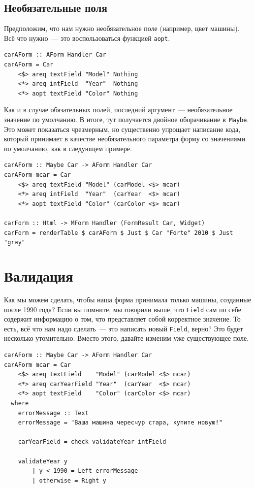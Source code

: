 \subsection{Необязательные поля}
Предположим, что нам нужно необязательное поле (например, цвет машины). Всё
что нужно~--- это воспользоваться функцией \lstinline'aopt'.

\begin{lstlisting}
carAForm :: AForm Handler Car
carAForm = Car
    <$> areq textField "Model" Nothing
    <*> areq intField  "Year"  Nothing
    <*> aopt textField "Color" Nothing
\end{lstlisting}%

Как и в случае обязательных полей, последний аргумент~--- необязательное
значение по умолчанию.  В итоге, тут получается двойное оборачивание
в~\lstinline'Maybe'. Это может показаться чрезмерным, но существенно упрощает
написание кода, который принимает в качестве необязательного параметра форму со
значениями по умолчанию, как в следующем примере.

\begin{lstlisting}
carAForm :: Maybe Car -> AForm Handler Car
carAForm mcar = Car
    <$> areq textField "Model" (carModel <$> mcar)
    <*> areq intField  "Year"  (carYear  <$> mcar)
    <*> aopt textField "Color" (carColor <$> mcar)

carForm :: Html -> MForm Handler (FormResult Car, Widget)
carForm = renderTable $ carAForm $ Just $ Car "Forte" 2010 $ Just "gray"
\end{lstlisting}

\section{Валидация}
Как мы можем сделать, чтобы наша форма принимала только машины, созданные после
1990 года?  Если вы помните, мы говорили выше, что \lstinline'Field' сам по
себе содержит информацию о том, что представляет собой корректное значение. То
есть, всё что нам надо сделать~--- это написать новый \lstinline'Field', верно?
Это будет несколько утомительно. Вместо этого, давайте изменим уже существующее
поле.

\begin{lstlisting}
carAForm :: Maybe Car -> AForm Handler Car
carAForm mcar = Car
    <$> areq textField    "Model" (carModel <$> mcar)
    <*> areq carYearField "Year"  (carYear  <$> mcar)
    <*> aopt textField    "Color" (carColor <$> mcar)
  where
    errorMessage :: Text
    errorMessage = "Ваша машина чересчур стара, купите новую!"

    carYearField = check validateYear intField

    validateYear y
        | y < 1990 = Left errorMessage
        | otherwise = Right y
\end{lstlisting}

